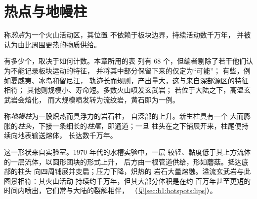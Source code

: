 \section{热点与地幔柱}\label{sec:b1:hotspots:plumes}

\begin{definition}[热点]\label{def:b1:hotspots:hotspot}
称\emph{热点}为一个火山活动区，其位置
不依赖于板块边界，持续活动数千万年，
并被认为由比周围更热的物质供给。
\end{definition}

有多少个，取决于如何计数。本章所用的表
列有 68 个，但编者剔除了若干他们认为不能记录板块运动的特征，
并将其中部分保留下来的仅定为“可能”；
有些，例如夏威夷、冰岛和留尼汪，
轨迹长而规则，产出量大，这与来自深部源区的特征相符；
其他则规模小、寿命短。多数火山喷发玄武岩；
若位于大陆之下，高温玄武岩会熔化，
而大规模喷发转为流纹岩，黄石即为一例。

\begin{definition}[地幔柱]\label{def:b1:hotspots:plume}
称\emph{地幔柱}为一股炽热而具浮力的岩石柱，
自深部的上升。新生柱具有一个
大而膨胀的\emph{柱头}，下接一条细长的\emph{柱尾}，即通道；一旦
柱头在之下铺展开来，柱尾便持续向地表输送熔体，
长达数千万年。
\end{definition}

这一形状来自实验室。1970 年代的水槽实验中，一层
较轻、黏度低于其上方流体的一层流体，以圆形团块的形式上升，
后方由一根管道供给，形如蘑菇。抵达底部的柱头
向四周铺展并变扁；压力下降，炽热的
岩石大量熔融。溢流玄武岩与此图景相符：其火山活动
持续约千万年，但其大部分体积是在约
百万年甚至更短的时间内喷出，它们常与大陆的裂解相伴，
（见\cref{sec:b1:hotspots:lips}）。

